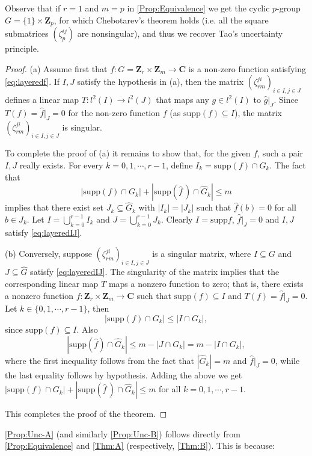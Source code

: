 \documentclass[a4paper,12pt,reqno]{amsart}
\def\Z{\mathbf{Z}}
\def\C{\mathbf{C}}
\def\supp{\mathrm{supp}}
\begin{document}
Observe that if  $r=1$  and $m=p$   in \autoref{Prop:Equivalence} we get  the  cyclic $p$-group   $G= \{1\} \times \Z_p$, for which Chebotarev's theorem holds (i.e. all the square submatrices $(\zeta_p^{ij})$ are nonsingular), and  thus we recover Tao's uncertainty principle.


\begin{proof} (a)
Assume first that  $f : G=\Z_r \times \Z_m \to \C$ is a non-zero function satisfying \eqref{eq:layeredf}. If $I, J$ satisfy the hypothesis in (a), then the matrix $(\zeta_{rm}^{ji})_{i \in I, j \in J}$ defines a linear map $T: l^2(I) \to l^2(J)$ that maps any $g \in l^2(I)$ to $\widehat{g}|_J$. Since $T(f) = \widehat{f} |_J = 0$ for the non-zero function $f$ (as $\supp(f) \subseteq I$), the matrix $(\zeta_{rm}^{ji})_{i \in I, j \in J}$ is singular.

To complete the proof of (a) it remains  to show that, for the given $f$,  such a pair $I, J$ 
really exists. For every  $k =0, 1, \cdots , r-1$, define $I_k = \supp(f) \cap G_k$. The fact that 
\[
|\supp(f) \cap G_k| + |\supp(\widehat{f} \, ) \cap \widehat{G}_k| \leq m 
\]
implies that there exist set $J_k \subseteq \widehat{G}_k$ with $|I_k| = |J_k|$ such that $\widehat f (b) = 0$ for all $b \in J_k$. Let $I = \bigcup_{k=0}^{r-1} I_k $ and $J = \bigcup_{k=0}^{r-1} J_k$. Clearly $I = \supp{f}$, $\widehat{f}|_J=0$ and $I, J$ satisfy \eqref{eq:layeredIJ}.


(b) Conversely, suppose $(\zeta_{rm}^{ji})_{i \in I, j \in J}$ is a singular matrix, where $I \subseteq G$ and $ J  \subseteq  \widehat{G}$   satisfy \eqref{eq:layeredIJ}.  The singularity of the matrix implies that the corresponding linear map $T$ maps a nonzero function to zero; that is, there exists a nonzero function $f: \Z_r \times \Z_m \to \C$ such that $\supp(f)  \subseteq I$ and $T( f)  = \widehat{f} |_J= 0$.
Let   $k  \in \{  0,1, \cdots ,r-1\} $, then 
\[
|\supp(f) \cap G_k| \leq  |I \cap G_k |, 
\]
since  $\supp(f)  \subseteq I$. Also 
\[
|\supp(\widehat{f}) \cap \widehat{G}_k| \leq m- |J \cap G_k| = m - |I \cap G_k|, 
\]
where the first inequality follows from the fact that $ |\widehat{G}_k|= m$ and  $\widehat{f}|_{J}= 0$, while the last equality follows  by hypothesis. 
Adding the above we get $|\supp(f) \cap G_k| + |\supp(\widehat{f} \, ) \cap \widehat{G}_k| \leq m$ for all $k=0, 1, \cdots, r-1$.


This completes the proof of the theorem.
\end{proof}

\autoref{Prop:Unc-A} (and similarly \autoref{Prop:Unc-B}) follows directly from \autoref{Prop:Equivalence} and \autoref{Thm:A} (respectively, \autoref{Thm:B}). This is because:
\end{document}
